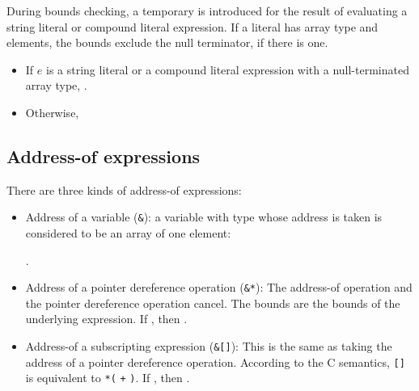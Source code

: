 During bounds checking, a temporary is introduced for the result
of evaluating a string literal or compound literal expression.
If a literal  has array type and  elements, the bounds
exclude the null terminator, if there is one.
\begin{itemize}
\item If $e$ is a string literal or a compound literal expression with
a null-terminated array type,
.
\item Otherwise,
\end{itemize}

\subsection{Address-of expressions}
\label{section:address-of-expression-bounds}

There are three kinds of address-of expressions:
\begin{itemize}
\item Address of a variable (\lstinline|&|): a variable  with type  
whose address is taken is considered to be an array of one element:

            {}.
            
\item Address of a pointer dereference operation (\lstinline|&*|):
The address-of operation and the pointer dereference operation cancel. 
The bounds are the bounds of the underlying expression. 
If , then
.

\item Address-of a subscripting expression (\lstinline|&|\lstinline|[|\lstinline|]|):
This is the same as taking the address of a pointer dereference operation.
According to the C semantics, \lstinline|[|\lstinline|]| is equivalent
to \lstinline|*(| \lstinline|+| \lstinline|)|.  If 
, then
.
\end{itemize}
   
